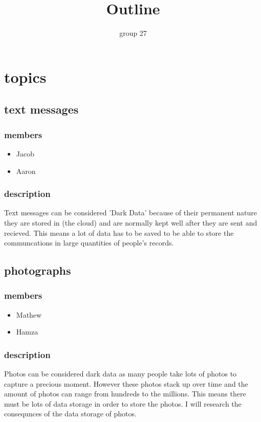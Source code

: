 \documentclass{article}
\begin{document}
\title{Outline}
\author{group 27}

\maketitle
\newpage


\section{topics}
\subsection{text messages} 
\subsubsection{members}
\begin{itemize}
    \item Jacob
    \item Aaron
\end{itemize}
\subsubsection{description}
 Text messages can be considered 'Dark Data' because of their permanent nature they are stored in (the cloud) and 
 are normally kept well after they are sent and recieved. This means a lot of data has to be saved to be able to
 store the communcations in large quantities of people's records. 

\subsection{photographs}
\subsubsection{members}
\begin{itemize}
    \item Mathew
    \item Hamza
\end{itemize}
\subsubsection{description}
Photos can be considered dark data as many people take lots of photos to capture a precious moment. However these photos stack up over time and the amount of photos can range from hundreds to the millions. This means there must be lots of data storage in order to store the photos.
I will research the consequnces of the data storage of photos.
\end{document}
